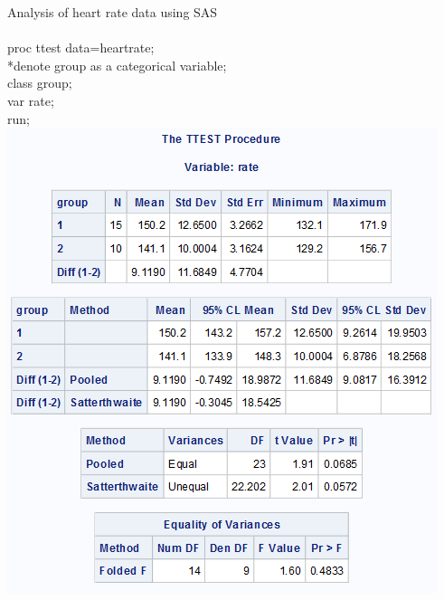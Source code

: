 \begin{multicols}{2}
Analysis of heart rate data using SAS\\~\\
proc ttest data=heartrate;\\
*denote group as a categorical variable;\\
class group;\\
var rate;\\
run;\\
\columnbreak
\includegraphics[scale=0.75]{heartratettest}
\end{multicols}
